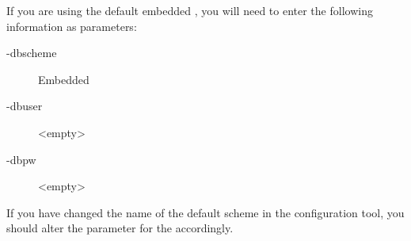 
If you are using the default embedded \gddb{}, you will need to enter the following information as parameters:
\begin{description}
\item[-dbscheme]{Embedded}
\item[-dbuser]{<empty>}
\item[-dbpw]{<empty>}

\end{description}
If you have changed the name of the default \gddb{} scheme in the configuration tool, you should alter the parameter for the  accordingly. 

